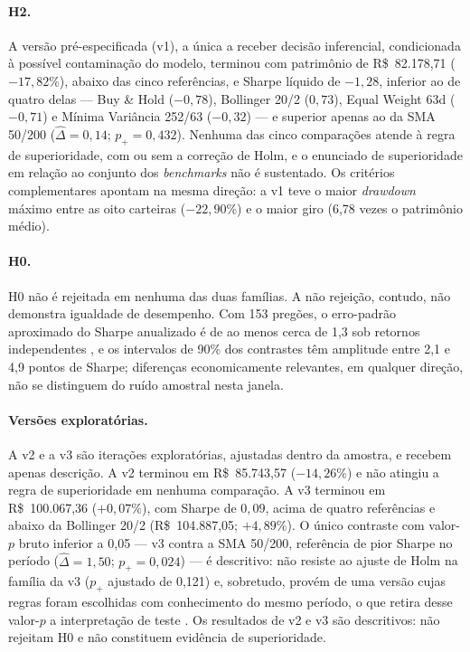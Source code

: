 \paragraph*{H2.} A versão pré-especificada (v1), a única a receber decisão inferencial, condicionada à possível contaminação do modelo, terminou com patrimônio de R\$~82.178,71 ($-17{,}82\%$), abaixo das cinco referências, e Sharpe líquido de $-1{,}28$, inferior ao de quatro delas --- Buy \& Hold ($-0{,}78$), Bollinger 20/2 ($0{,}73$), Equal Weight 63d ($-0{,}71$) e Mínima Variância 252/63 ($-0{,}32$) --- e superior apenas ao da SMA 50/200 ($\hat{\Delta} = 0{,}14$; $p_{+} = 0{,}432$). Nenhuma das cinco comparações atende à regra de superioridade, com ou sem a correção de Holm, e o enunciado de superioridade em relação ao conjunto dos \textit{benchmarks} não é sustentado. Os critérios complementares apontam na mesma direção: a v1 teve o maior \textit{drawdown} máximo entre as oito carteiras ($-22{,}90\%$) e o maior giro (6,78 vezes o patrimônio médio).

\paragraph*{H0.} H0 não é rejeitada em nenhuma das duas famílias. A não rejeição, contudo, não demonstra igualdade de desempenho. Com 153 pregões, o erro-padrão aproximado do Sharpe anualizado é de ao menos cerca de 1,3 sob retornos independentes \citep{Lo2002}, e os intervalos de 90\% dos contrastes têm amplitude entre 2,1 e 4,9 pontos de Sharpe; diferenças economicamente relevantes, em qualquer direção, não se distinguem do ruído amostral nesta janela.

\paragraph*{Versões exploratórias.} A v2 e a v3 são iterações exploratórias, ajustadas dentro da amostra, e recebem apenas descrição. A v2 terminou em R\$~85.743,57 ($-14{,}26\%$) e não atingiu a regra de superioridade em nenhuma comparação. A v3 terminou em R\$~100.067,36 ($+0{,}07\%$), com Sharpe de $0{,}09$, acima de quatro referências e abaixo da Bollinger 20/2 (R\$~104.887,05; $+4{,}89\%$). O único contraste com valor-$p$ bruto inferior a 0,05 --- v3 contra a SMA 50/200, referência de pior Sharpe no período ($\hat{\Delta} = 1{,}50$; $p_{+} = 0{,}024$) --- é descritivo: não resiste ao ajuste de Holm na família da v3 ($p_{+}$ ajustado de 0,121) e, sobretudo, provém de uma versão cujas regras foram escolhidas com conhecimento do mesmo período, o que retira desse valor-$p$ a interpretação de teste \citep{White2000, Bailey2017}. Os resultados de v2 e v3 são descritivos: não rejeitam H0 e não constituem evidência de superioridade.


